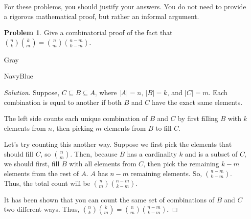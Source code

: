 \documentclass[12pt]{amsart}
\newcounter{problem_number}[section]
\theoremstyle{named}
\newenvironment{soln}
{\begin{color}{Gray}\begin{framed}\begin{color}{NavyBlue}\begin{proof}[Solution]
\doublespacing}
{\end{proof}\end{color}\end{framed}\end{color}}
\theoremstyle{definition}
\newtheorem{problem}{Problem}
\begin{document}
For these problems, you should justify your answers. You do not need to provide a rigorous mathematical proof, but rather an informal argument.

\vspace{5mm}

\begin{problem}
	Give a combinatorial proof of the fact that ${n\choose k}{k\choose m} = {n\choose m}{n-m\choose k-m}$.
\end{problem}

\begin{soln}
    \phantom{ }

	\noindent Suppose, $C \subseteq B \subseteq A$, where $|A| = n$, $|B| = k$, and $|C| = m$.
    Each combination is equal to another if both $B$ and $C$ have the exact same elements.

    \phantom{ }

    \noindent The left side counts each unique combination of $B$ and $C$ by first filling $B$ with $k$ 
    elements from $n$, then picking $m$ elements from $B$ to fill $C$. 

    \phantom{ }

    \noindent Let's try counting this another way. Suppose we first pick the elements that should
    fill $C$, so ${n \choose m}$. Then, because $B$ has a cardinality $k$ and is a subset of $C$,
    we should first, fill $B$ with all elements from $C$, then pick the remaining $k - m$ elements
    from the rest of $A$. $A$ has $n - m$ remaining elements. So, ${n-m \choose k-m}$. Thus, the total
    count will be ${n\choose m}{n-m\choose k-m}$. 

    \phantom{ }
    
    \noindent It has been shown that you can count the same set of combinations of $B$ and $C$
    two different ways. Thus, ${n\choose k}{k\choose m} = {n\choose m}{n-m\choose k-m}$.







\end{soln}
\end{document}
